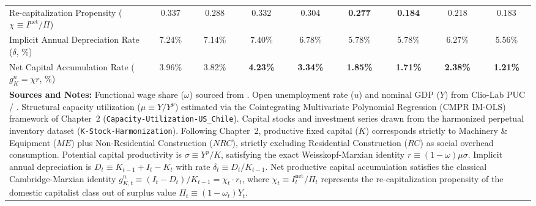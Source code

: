 \begin{table}[htbp]
{\begin{tabular}{lcccccccc}
Re-capitalization Propensity ($\chi \equiv I^{\text{net}}/\Pi$) & 0.337 & 0.288 & 0.332 & 0.304 & \textbf{0.277} & \textbf{0.184} & 0.218 & 0.183 \\
Implicit Annual Depreciation Rate ($\delta$, \%) & 7.24\% & 7.14\% & 7.40\% & 6.78\% & 5.78\% & 5.78\% & 6.27\% & 5.56\% \\
Net Capital Accumulation Rate ($g^n_K = \chi r$, \%) & 3.96\% & 3.82\% & \textbf{4.23\%} & \textbf{3.34\%} & \textbf{1.85\%} & \textbf{1.71\%} & \textbf{2.38\%} & \textbf{1.21\%} \\
\bottomrule
\multicolumn{9}{p{17.2cm}}{\footnotesize \textbf{Sources and Notes:} Functional wage share ($\omega$) sourced from \citet{Astorga2023}. Open unemployment rate ($u$) and nominal GDP ($Y$) from Clio-Lab PUC / \citet{DiazLudersWagner2016}. Structural capacity utilization ($\mu \equiv Y/Y^p$) estimated via the Cointegrating Multivariate Polynomial Regression (CMPR IM-OLS) framework of Chapter~2 (\texttt{Capacity-Utilization-US\_Chile}). Capital stocks and investment series drawn from the harmonized perpetual inventory dataset (\texttt{K-Stock-Harmonization}). Following Chapter~2, productive fixed capital ($K$) corresponds strictly to Machinery \& Equipment ($ME$) plus Non-Residential Construction ($NRC$), strictly excluding Residential Construction ($RC$) as social overhead consumption. Potential capital productivity is $\sigma \equiv Y^p / K$, satisfying the exact Weisskopf-Marxian identity $r \equiv (1 - \omega) \mu \sigma$. Implicit annual depreciation is $D_t \equiv K_{t-1} + I_t - K_t$ with rate $\delta_t \equiv D_t / K_{t-1}$. Net productive capital accumulation satisfies the classical Cambridge-Marxian identity $g^n_{K, t} \equiv (I_t - D_t) / K_{t-1} = \chi_t \cdot r_t$, where $\chi_t \equiv I^{\text{net}}_t / \Pi_t$ represents the re-capitalization propensity of the domestic capitalist class out of surplus value $\Pi_t \equiv (1 - \omega_t) Y_t$.}
\end{tabular}%
}
\end{table}
